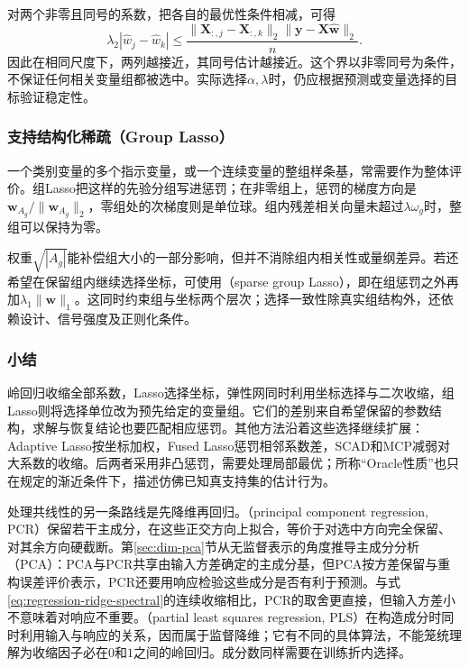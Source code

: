 对两个非零且同号的系数，把各自的最优性条件相减，可得
\[
  \lambda_2|\widehat w_j-\widehat w_k|
  \leq\frac{\lVert\bm{X}_{:,j}-\bm{X}_{:,k}\rVert_2
                  \lVert\bm{y}-\bm{X}\widehat{\bm{w}}\rVert_2}{n}.
\]
因此在相同尺度下，两列越接近，其同号估计越接近。这个界以非零同号为条件，不保证任何相关变量组都被选中。实际选择$\alpha,\lambda$时，仍应根据预测或变量选择的目标验证稳定性。

\subsubsection{支持结构化稀疏（Group Lasso）}
\label{sec:regression-group-lasso}

一个类别变量的多个指示变量，或一个连续变量的整组样条基，常需要作为整体评价。组Lasso把这样的先验分组写进惩罚；在非零组上，惩罚的梯度方向是$\bm{w}_{A_g}/\lVert\bm{w}_{A_g}\rVert_2$，零组处的次梯度则是单位球。组内残差相关向量未超过$\lambda\omega_g$时，整组可以保持为零。

权重$\sqrt{|A_g|}$能补偿组大小的一部分影响，但并不消除组内相关性或量纲差异。若还希望在保留组内继续选择坐标，可使用（sparse group Lasso），即在组惩罚之外再加$\lambda_1\lVert\bm{w}\rVert_1$。这同时约束组与坐标两个层次；选择一致性除真实组结构外，还依赖设计、信号强度及正则化条件。

\subsubsection{小结}
\label{sec:regression-regularization-summary}

岭回归收缩全部系数，Lasso选择坐标，弹性网同时利用坐标选择与二次收缩，组Lasso则将选择单位改为预先给定的变量组。它们的差别来自希望保留的参数结构，求解与恢复结论也要匹配相应惩罚。其他方法沿着这些选择继续扩展：Adaptive Lasso按坐标加权，Fused Lasso惩罚相邻系数差，SCAD和MCP减弱对大系数的收缩。后两者采用非凸惩罚，需要处理局部最优；所称“Oracle性质”也只在规定的渐近条件下，描述仿佛已知真支持集的估计行为。

处理共线性的另一条路线是先降维再回归。（principal component regression, PCR）保留若干主成分，在这些正交方向上拟合，等价于对选中方向完全保留、对其余方向硬截断。第\ref{sec:dim-pca}节从无监督表示的角度推导主成分分析（PCA）：PCA与PCR共享由输入方差确定的主成分基，但PCA按方差保留与重构误差评价表示，PCR还要用响应检验这些成分是否有利于预测。与式\eqref{eq:regression-ridge-spectral}的连续收缩相比，PCR的取舍更直接，但输入方差小不意味着对响应不重要。（partial least squares regression, PLS）在构造成分时同时利用输入与响应的关系，因而属于监督降维；它有不同的具体算法，不能笼统理解为收缩因子必在$0$和$1$之间的岭回归。成分数同样需要在训练折内选择。

